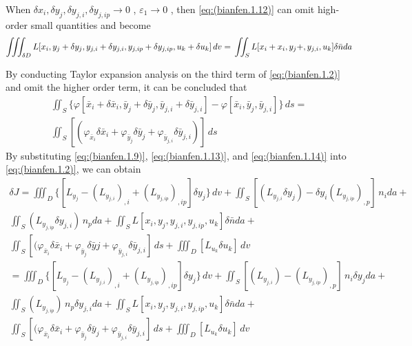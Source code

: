 When $ \delta x_i, \delta y_j, \delta y_ {j, i}, \delta y_ {j, ip} \to 0 $ , $ \varepsilon_1 \to 0 $ , then \ref{eq:(bianfen.1.12)} can omit high-order small quantities and become
\begin{equation} \label{eq:(bianfen.1.13)}    
\iiint_{\delta D} L[x_i,y_j+\delta y_j,y_{j,i}+\delta y_{j,i},y_{j,ip}+\delta y_{j, ip},u_k+\delta u_k] \,dv 
\\=\\\iint_{S} L[x_i+ x_i,y_j+,y_{j,i},u_k]\delta \bar{n} da
\end{equation} 

By conducting Taylor expansion analysis on the third term of \ref{eq:(bianfen.1.2)} and omit the higher order term, it can be concluded that
\begin{multline} \label{eq:(bianfen.1.14)}
\iint_S \{\varphi[\bar {x}_i +\delta \bar {x}_i ,\bar {y}_j +\delta \bar {y}_j ,\bar {y}_ {j,i}+\delta \bar {y}_ {j,i}] -\varphi[\bar {x}_i ,\bar {y}_j ,\bar {y}_ {j,i}]\} \,ds
=\\\iint_S [(\varphi_{\bar {x}_i } \delta \bar {x}_i  + \varphi_{\bar {y}_j } \delta \bar{y} _j+\varphi_{\bar {y}_ {j,i}} \delta \bar {y}_ {j,i})] \,ds
\end{multline} 
By substituting \ref{eq:(bianfen.1.9)}, \ref{eq:(bianfen.1.13)}, and \ref{eq:(bianfen.1.14)} into \ref{eq:(bianfen.1.2)}, we can obtain
\begin{multline} \label{eq:(bianfen.1.15)}    
\delta J = \iiint_D \{[L_{y_j} - \left(L_{y_{j,i}}\right)_{,i}+\left(L_{y_{j,ip}}\right)_{,ip}]\delta y_j \}\,dv +\iint_S [\left(L_{y_{j,i}} \delta y_j \right) -\delta y_{i} \left(L_{y_{j,ip}}\right)_{,p}]\,n_i da+
\\
\iint_S \left(L_{y_{j,ip}} \delta y_{j,i} \right)\,n_p da
+\iint_S L[x_i,y_j,y_{j,i},y_{j,ip},u_k]\delta \bar{n} da+ 
\\\iint_S [(\varphi_{\bar {x}_i } \delta \bar {x}_i  + \varphi_{\bar {y}_j } \delta \bar{y} j
+\varphi_{\bar {y}_ {j,i}} \delta \bar {y}_ {j,i}] \,ds
+\iiint_D [L_{u_k} \delta u_k] \,dv
\\=\iiint_D \{[L_{y_j} - \left(L_{y_{j,i}}\right)_{,i}+\left(L_{y_{j,ip}}\right)_{, ip}]\delta y_j \}\,dv 
+\iint_S [\left(L_{y_{j,i}}  \right) - \left(L_{y_{j,ip}}\right)_{, p}]\,n_i \delta y_j da+
\\\iint_S \left(L_{y_{j,ip}}  \right)\,n_p \delta y_{j,i} da
+\iint_S L[x_i,y_j,y_{j,i},y_{j,ip},u_k]\delta \bar{n} da
+ 
\\\iint_S [(\varphi_{\bar {x}_i } \delta \bar {x}_i  + \varphi_{\bar {y}_j } \delta \bar{y} _j+\varphi_{\bar {y}_ {j,i}} \delta \bar {y}_ {j,i}] \,ds
+\iiint_D [L_{u_k} \delta u_k] \,dv
\end{multline} 
